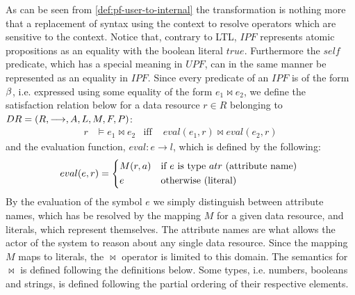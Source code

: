 As can be seen from \autoref{def:pf-user-to-internal} the transformation is nothing more that a replacement of syntax using the context to resolve operators which are sensitive to the context. Notice that, contrary to LTL, $IPF$ represents atomic propositions as an equality with the boolean literal $true$. Furthermore the $self$ predicate, which has a special meaning in $UPF$, can in the same manner be represented as an equality in $IPF$. Since every predicate of an $IPF$ is of the form $\beta$, i.e. expressed using some equality of the form $e_1 \bowtie e_2$, we define the satisfaction relation below for a data resource $r \in R$ belonging to $DR= \left( R, \longrightarrow, A, L, M, F, P \right)$:
\begin{align*}
    r &\models e_1 \bowtie e_2 &\text{iff }& eval(e_1, r) \bowtie eval(e_2, r)
\end{align*}
and the evaluation function, $eval : e \rightarrow l$, which is defined by the following:
\begin{align*}
    eval(e,r) =
    \begin{cases*}
        M(r, a)   & if $e$ is type $atr$ (attribute name) \\
        e         & otherwise (literal)
    \end{cases*}
\end{align*}
By the evaluation of the symbol $e$ we simply distinguish between attribute names, which has be resolved by the mapping $M$ for a given data resource, and literals, which represent themselves. The attribute names are what allows the actor of the system to reason about any single data resource. Since the mapping $M$ maps to literals, the $\bowtie$ operator is limited to this domain. The semantics for $\bowtie$ is defined following the definitions below. Some types, i.e. numbers, booleans and strings, is defined following the partial ordering of their respective elements.
